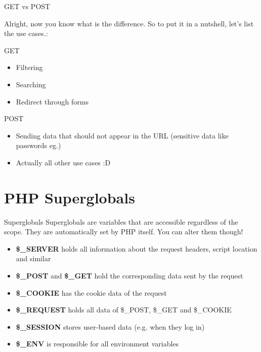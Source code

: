 \begin{frame}{GET vs POST}
	
	Alright, now you know what is the difference. So to put it in a nutshell, let's list the use cases.: \pause
	
	GET \pause
	\begin{itemize}
	\item Filtering \pause
	\item Searching \pause
	\item Redirect through forms \pause
	\end{itemize}	
	
	POST \pause
	\begin{itemize}
	\item Sending data that should not appear in the URL (sensitive data like passwords eg.) \pause
	\item Actually all other use cases :D
	\end{itemize}
	
	
\end{frame}

\section{PHP Superglobals}

\begin{frame}[fragile]{Superglobals}
Superglobals are variables that are accessible regardless of the scope. They are automatically set by PHP itself. You can alter them though!
	\pause
	
	\begin{itemize}
        \item \textbf{\$\_{}SERVER} holds all information about the request headers, script location and similar	
        \pause
		\item \textbf{\$\_{}POST} and \textbf{\$\_{}GET} hold the corresponding data sent by the request
		\pause
		\item \textbf{\$\_{}COOKIE} has the cookie data of the request
		\pause
		\item \textbf{\$\_{}REQUEST} holds all data of \$\_{}POST, \$\_{}GET and \$\_{}COOKIE
		\pause
		\item \textbf{\$\_{}SESSION} stores user-based data (e.g. when they log in)
		\pause
		\item \textbf{\$\_{}ENV} is responsible for all environment variables
	\end{itemize}
\end{frame}

